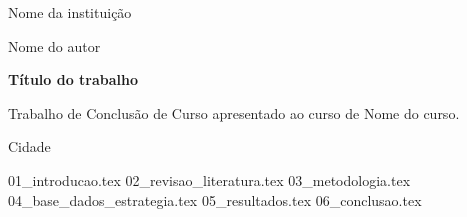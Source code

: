 \documentclass[12pt,a4paper]{report}
\title{\tituloTCC}
\author{\autorTCC}
\date{\anoTCC}
\newcommand{\instituicao}{Nome da instituição}
\newcommand{\curso}{Nome do curso}
\newcommand{\autorTCC}{Nome do autor}
\newcommand{\tituloTCC}{Título do trabalho}
\newcommand{\cidadeTCC}{Cidade}
\newcommand{\anoTCC}{\the\year}
\begin{document}

\begin{titlepage}
    \centering
    {\large \instituicao\par}
    \vspace{1.5cm}
    {\Large \autorTCC\par}
    \vspace{2cm}
    {\LARGE \bfseries \tituloTCC\par}
    \vspace{2cm}
    {\large Trabalho de Conclusão de Curso apresentado ao curso de \curso.\par}
    \vfill
    {\large \cidadeTCC\par}
    {\large \anoTCC\par}
\end{titlepage}

\clearpage
{}
\tableofcontents
\clearpage


{01_introducao.tex}
{02_revisao_literatura.tex}
{03_metodologia.tex}
{04_base_dados_estrategia.tex}
{05_resultados.tex}
{06_conclusao.tex}



\end{document}
